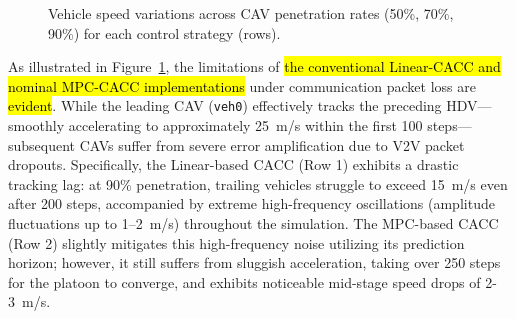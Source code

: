 \documentclass{ieeeaccess}
\begin{document}
\begin{figure}[htbp]
  \begin{minipage}[c]{\rowlabw}\centering
  \end{minipage}
  \begin{minipage}[c]{\panelw}\centering {} \end{minipage}\hspace{\sep}
  \begin{minipage}[c]{\panelw}\centering {} \end{minipage}\hspace{\sep}
  \begin{minipage}[c]{\panelw}\centering {} \end{minipage}

  \caption{Vehicle speed variations across CAV penetration rates (50\%, 70\%, 90\%) for each control strategy (rows).
  }
  \label{fig:speed_grid}
\end{figure}

As illustrated in Figure~\ref{fig:speed_grid}, the limitations of \hl{the conventional Linear-CACC and nominal MPC-CACC implementations} under communication packet loss are \hl{evident}. While the leading CAV (\texttt{veh0}) effectively tracks the preceding HDV—smoothly accelerating to approximately 25~m/s within the first 100 steps—subsequent CAVs suffer from severe error amplification due to V2V packet dropouts. Specifically, the Linear-based CACC (Row 1) exhibits a drastic tracking lag: at 90\% penetration, trailing vehicles struggle to exceed 15~m/s even after 200 steps, accompanied by extreme high-frequency oscillations (amplitude fluctuations up to 1--2~m/s) throughout the simulation. The MPC-based CACC (Row 2) slightly mitigates this high-frequency noise utilizing its prediction horizon; however, it still suffers from sluggish acceleration, taking over 250 steps for the platoon to converge, and exhibits noticeable mid-stage speed drops of 2-3~m/s.
\end{document}
